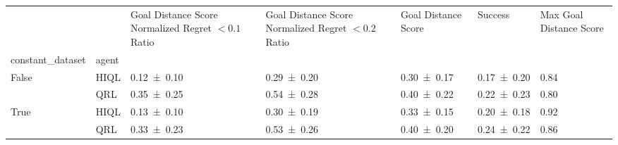 \begin{tabular}{lllllll}
\toprule
 &  & Goal Distance Score Normalized Regret $< 0.1$ Ratio & Goal Distance Score Normalized Regret $< 0.2$ Ratio & Goal Distance Score & Success & Max Goal Distance Score \\
constant_dataset & agent &  &  &  &  &  \\
\midrule
\multirow[t]{2}{*}{False} & HIQL & \num{0.12 \pm 0.10} & \num{0.29 \pm 0.20} & \num{0.30 \pm 0.17} & \num{0.17 \pm 0.20} & 0.84 \\
 & QRL & \num{0.35 \pm 0.25} & \num{0.54 \pm 0.28} & \num{0.40 \pm 0.22} & \num{0.22 \pm 0.23} & 0.80 \\
\cline{1-7}
\multirow[t]{2}{*}{True} & HIQL & \num{0.13 \pm 0.10} & \num{0.30 \pm 0.19} & \num{0.33 \pm 0.15} & \num{0.20 \pm 0.18} & 0.92 \\
 & QRL & \num{0.33 \pm 0.23} & \num{0.53 \pm 0.26} & \num{0.40 \pm 0.20} & \num{0.24 \pm 0.22} & 0.86 \\
\cline{1-7}
\bottomrule
\end{tabular}
